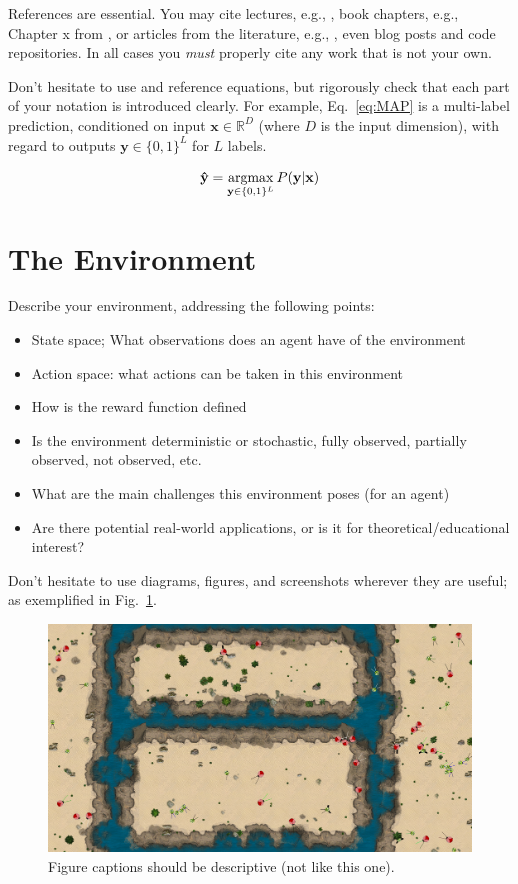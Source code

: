 \documentclass[journal, a4paper]{IEEEtran}
\newcommand{\argmax}{\operatornamewithlimits{argmax}}
\newcommand{\x}{\mathbf{x}}
\newcommand{\y}{\mathbf{y}}
\newcommand{\ypred}{\mathbf{\hat y}}
\begin{document}
References are essential. You may cite lectures, e.g., \cite{Lecture3}, book chapters, e.g., Chapter x from \cite{Barber}, or articles from the literature, e.g., \cite{Astar,DeepMindSC2}, even blog posts and code repositories. In all cases you \emph{must} properly cite any work that is not your own.

Don't hesitate to use and reference equations, but rigorously check that each part of your notation is introduced clearly. For example, Eq.~\eqref{eq:MAP} is a multi-label prediction, conditioned on input $\x \in \mathbb{R}^D$ (where $D$ is the input dimension), with regard to outputs $\y \in \{0,1\}^L$ for $L$ labels. 

\begin{equation}
	\label{eq:MAP}
	\ypred = \argmax_{\y \in \{0,1\}^L} P(\y|\x)
\end{equation}

\section{The Environment}

Describe your environment, addressing the following points:

\begin{itemize}
	\item State space; What observations does an agent have of the environment
	\item Action space: what actions can be taken in this environment
	\item How is the reward function defined
	\item Is the environment deterministic or stochastic, fully observed, partially observed, not observed, etc. 
	\item What are the main challenges this environment poses (for an agent)
	\item Are there potential real-world applications, or is it for theoretical/educational interest?
\end{itemize}

Don't hesitate to use diagrams, figures, and screenshots wherever they are useful; as exemplified in Fig.~\ref{env_figure}.  

\begin{figure}[ht]
	\centering
	\includegraphics[width=0.8\columnwidth]{alife.png}
	\caption{\label{env_figure}Figure captions should be descriptive (not like this one). }
\end{figure}
\end{document}
